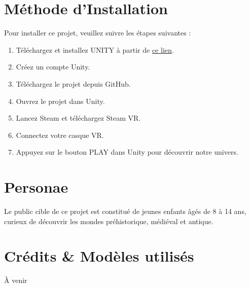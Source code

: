 \documentclass[
]{article}
\begin{document}
\section{Méthode d'Installation}\label{muxe9thode-dinstallation}

Pour installer ce projet, veuillez suivre les étapes suivantes :

\begin{enumerate}
\def\labelenumi{\arabic{enumi}.}
\item
  Téléchargez et installez UNITY à partir de
  \href{https://public-cdn.cloud.unity3d.com/hub/prod/UnityHubSetup.exe}{ce
  lien}.
\item
  Créez un compte Unity.
\item
  Téléchargez le projet depuis GitHub.
\item
  Ouvrez le projet dans Unity.
\item
  Lancez Steam et téléchargez Steam VR.
\item
  Connectez votre casque VR.
\item
  Appuyez sur le bouton PLAY dans Unity pour découvrir notre univers.
\end{enumerate}

\section{Personae}\label{personae}

Le public cible de ce projet est constitué de jeunes enfants âgés de 8 à
14 ans, curieux de découvrir les mondes préhistorique, médiéval et
antique.

\section{Crédits \& Modèles
utilisés}\label{cruxe9dits-moduxe8les-utilisuxe9s}

À venir
\end{document}
